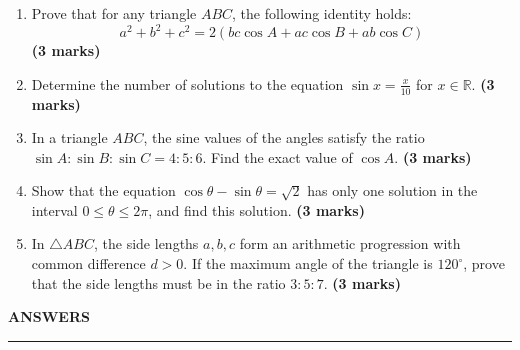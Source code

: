 \documentclass{article}
\begin{document}
\begin{enumerate}
    \item Prove that for any triangle $ABC$, the following identity holds:
    \begin{equation*}
    a^2 + b^2 + c^2 = 2(bc\cos A + ac\cos B + ab\cos C)
    \end{equation*} \hfill \textbf{(3 marks)}
    \vspace{0.5cm}

    \item Determine the number of solutions to the equation $\sin x = \frac{x}{10}$ for $x \in \mathbb{R}$. \hfill \textbf{(3 marks)}
    \vspace{0.5cm}

    \item In a triangle $ABC$, the sine values of the angles satisfy the ratio $\sin A : \sin B : \sin C = 4 : 5 : 6$. Find the exact value of $\cos A$. \hfill \textbf{(3 marks)}
    \vspace{0.5cm}

    \item Show that the equation $\cos\theta - \sin\theta = \sqrt{2}$ has only one solution in the interval $0 \le \theta \le 2\pi$, and find this solution. \hfill \textbf{(3 marks)}
    \vspace{0.5cm}

    \item In $\triangle ABC$, the side lengths $a, b, c$ form an arithmetic progression with common difference $d > 0$. If the maximum angle of the triangle is $120^\circ$, prove that the side lengths must be in the ratio $3 : 5 : 7$. \hfill \textbf{(3 marks)}
    \vspace{0.5cm}
\end{enumerate}
\newpage
\begin{center}\Large \textbf{ANSWERS}\end{center}\vspace{0.2cm}\hrule\vspace{0.5cm}
\end{document}
